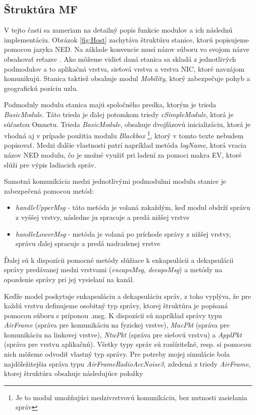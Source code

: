 \documentclass[11pt,twoside,a4paper]{book}
\begin{document}
\subsection{Štruktúra MF}
V tejto časti sa zameriam na detailný popis funkcie modulov a ich následnú implementáciu. Obrázok \ref{fig:Host} zachytáva štruktúru stanice, ktorú popisujeme pomocou jazyka NED. Na základe konvencie musí názov súboru vo svojom názve obsahovať reťazec . Ako môžeme vidieť daná stanica sa skladá z jednotlivých podmodulov a to aplikačná vrstva, sieťová vrstva a vrstva NIC, ktoré navzájom komunikujú. Stanica taktiež obsahuje modul \textit{Mobility}, ktorý zabezpečuje pohyb a geografickú pozíciu uzlu. 

Podmoduly modulu stanica majú spoločného predka, ktorým je trieda \textit{BasicModule}. Táto trieda je ďalej potomkom triedy \textit{cSimpleModule}, ktorá je súčasťou Omnetu. Trieda \textit{BasicModule}, obsahuje dvojfázovú inicializáciu, ktorá je vhodná aj v prípade použitia modulu \textit{Blackbox} \footnote{Je to modul umožňujúci medzivrstvovú komunikáciu, bez nutnosti zasielania správ}, ktorý v tomto texte nebudem popisovať. Medzi ďalšie vlastnosti patrí napríklad metóda \textit{logName}, ktorá vracia názov NED modulu, čo je možné využiť pri ladení za pomoci makra EV, ktoré slúži pre výpis ladiacich správ. 

Samotná komunikácia medzi jednotlivými podmodulmi modulu stanice je zabezpečená pomocou metód:
\begin{itemize}
 \item \textit{handleUpperMsg} - táto metóda je volaná zakaždým, keď modul obdrží správu z vyššej vrstvy, následne ju spracuje a predá nižšej vrstve
 \item \textit{handleLowerMsg} - metóda je volaná po príchode správy z nižšej vrstvy, správu ďalej spracuje a predá nadradenej vrstve
\end{itemize}

Ďalej sú k dispozícii pomocné metódy slúžiace k enkapsulácii a dekapsulácii správy predávanej medzi vrstvami (\textit{encapsMsg, decapsMsg}) a metódy na opozdenie správy pri jej vysielaní na kanál.

Keďže model poskytuje enkapsuláciu a dekapsuláciu správ, z toho vyplýva, že pre každú vrstvu definujeme osobitný typ správy, ktorej štruktúra je popísaná pomocou súboru s príponou .msg. K dispozícii sú napríklad správy typu \textit{AirFrame} (správa pre komunikáciu na fyzickej vrstve), \textit{MacPkt} (správa pre komunikáciu na linkovej vrstve), \textit{NtwPkt} (správa pre sieťovú vrstvu) a \textit{ApplPkt} (správa pre vrstvu aplikačnú). Všetky typy správ sú rozšíriteľné, resp. si pomocou nich môžeme odvodiť vlastný typ správy. Pre potreby mojej simulácie bola najdôležitejšia správa typu \textit{AirFrameRadioAccNoise3}, zdedená z triedy \textit{AirFrame}, ktorej štruktúra obsahuje následujúce položky
\end{document}
